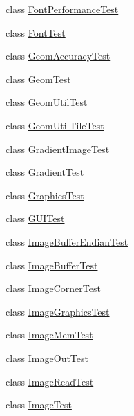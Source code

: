 \begin{DoxyCompactItemize}
\item 
class \mbox{\hyperlink{classorg_1_1newdawn_1_1slick_1_1tests_1_1_font_performance_test}{Font\+Performance\+Test}}
\item 
class \mbox{\hyperlink{classorg_1_1newdawn_1_1slick_1_1tests_1_1_font_test}{Font\+Test}}
\item 
class \mbox{\hyperlink{classorg_1_1newdawn_1_1slick_1_1tests_1_1_geom_accuracy_test}{Geom\+Accuracy\+Test}}
\item 
class \mbox{\hyperlink{classorg_1_1newdawn_1_1slick_1_1tests_1_1_geom_test}{Geom\+Test}}
\item 
class \mbox{\hyperlink{classorg_1_1newdawn_1_1slick_1_1tests_1_1_geom_util_test}{Geom\+Util\+Test}}
\item 
class \mbox{\hyperlink{classorg_1_1newdawn_1_1slick_1_1tests_1_1_geom_util_tile_test}{Geom\+Util\+Tile\+Test}}
\item 
class \mbox{\hyperlink{classorg_1_1newdawn_1_1slick_1_1tests_1_1_gradient_image_test}{Gradient\+Image\+Test}}
\item 
class \mbox{\hyperlink{classorg_1_1newdawn_1_1slick_1_1tests_1_1_gradient_test}{Gradient\+Test}}
\item 
class \mbox{\hyperlink{classorg_1_1newdawn_1_1slick_1_1tests_1_1_graphics_test}{Graphics\+Test}}
\item 
class \mbox{\hyperlink{classorg_1_1newdawn_1_1slick_1_1tests_1_1_g_u_i_test}{G\+U\+I\+Test}}
\item 
class \mbox{\hyperlink{classorg_1_1newdawn_1_1slick_1_1tests_1_1_image_buffer_endian_test}{Image\+Buffer\+Endian\+Test}}
\item 
class \mbox{\hyperlink{classorg_1_1newdawn_1_1slick_1_1tests_1_1_image_buffer_test}{Image\+Buffer\+Test}}
\item 
class \mbox{\hyperlink{classorg_1_1newdawn_1_1slick_1_1tests_1_1_image_corner_test}{Image\+Corner\+Test}}
\item 
class \mbox{\hyperlink{classorg_1_1newdawn_1_1slick_1_1tests_1_1_image_graphics_test}{Image\+Graphics\+Test}}
\item 
class \mbox{\hyperlink{classorg_1_1newdawn_1_1slick_1_1tests_1_1_image_mem_test}{Image\+Mem\+Test}}
\item 
class \mbox{\hyperlink{classorg_1_1newdawn_1_1slick_1_1tests_1_1_image_out_test}{Image\+Out\+Test}}
\item 
class \mbox{\hyperlink{classorg_1_1newdawn_1_1slick_1_1tests_1_1_image_read_test}{Image\+Read\+Test}}
\item 
class \mbox{\hyperlink{classorg_1_1newdawn_1_1slick_1_1tests_1_1_image_test}{Image\+Test}}

\end{DoxyCompactItemize}
